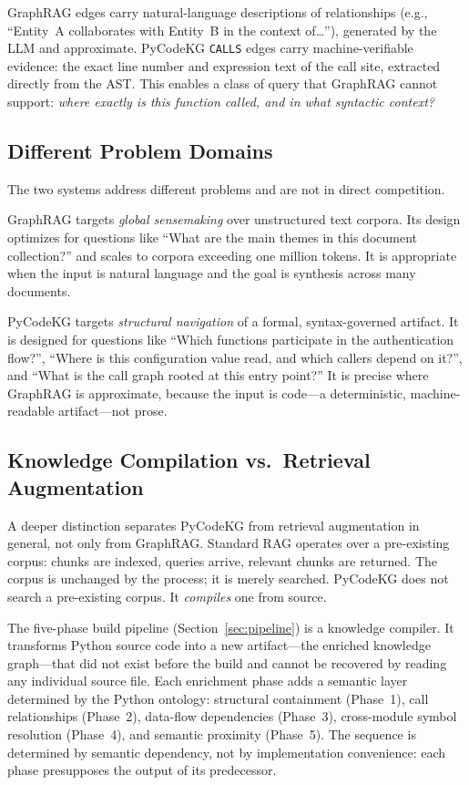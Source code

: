 \documentclass[10pt]{article}
\begin{document}
GraphRAG edges carry natural-language descriptions of relationships (e.g.,
``Entity~A collaborates with Entity~B in the context of\ldots''), generated by the
LLM and approximate. PyCodeKG \texttt{CALLS} edges carry machine-verifiable evidence:
the exact line number and expression text of the call site, extracted directly from
the AST. This enables a class of query that GraphRAG cannot support: \emph{where
exactly is this function called, and in what syntactic context?}

\subsection{Different Problem Domains}

The two systems address different problems and are not in direct competition.

GraphRAG targets \emph{global sensemaking} over unstructured text corpora. Its
design optimizes for questions like ``What are the main themes in this document
collection?'' and scales to corpora exceeding one million tokens. It is appropriate
when the input is natural language and the goal is synthesis across many documents.

PyCodeKG targets \emph{structural navigation} of a formal, syntax-governed artifact.
It is designed for questions like ``Which functions participate in the authentication
flow?'', ``Where is this configuration value read, and which callers depend on it?'',
and ``What is the call graph rooted at this entry point?'' It is precise where
GraphRAG is approximate, because the input is code---a deterministic, machine-readable
artifact---not prose.

\subsection{Knowledge Compilation vs.\ Retrieval Augmentation}

A deeper distinction separates PyCodeKG from retrieval augmentation in general,
not only from GraphRAG. Standard RAG operates over a pre-existing corpus: chunks
are indexed, queries arrive, relevant chunks are returned. The corpus is unchanged
by the process; it is merely searched. PyCodeKG does not search a pre-existing
corpus. It \emph{compiles} one from source.

The five-phase build pipeline (Section~\ref{sec:pipeline}) is a knowledge compiler.
It transforms Python source code into a new artifact---the enriched knowledge
graph---that did not exist before the build and cannot be recovered by reading any
individual source file. Each enrichment phase adds a semantic layer determined by
the Python ontology: structural containment (Phase~1), call relationships
(Phase~2), data-flow dependencies (Phase~3), cross-module symbol resolution
(Phase~4), and semantic proximity (Phase~5). The sequence is determined by semantic
dependency, not by implementation convenience: each phase presupposes the output of
its predecessor.
\end{document}
